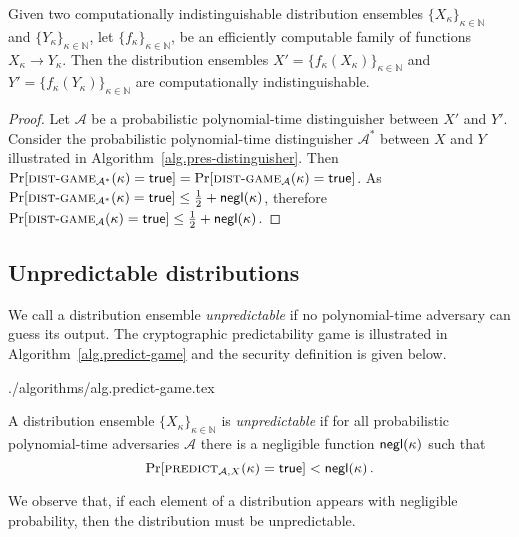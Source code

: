 \begin{lem}\label{lem:ind-pres}
  Given two
  computationally indistinguishable distribution ensembles
  $\{X_\kappa\}_{\kappa\in\mathbb{N}}$ and $\{Y_\kappa\}_{\kappa\in\mathbb{N}}$,
  let
  $\{f_\kappa\}_{\kappa\in\mathbb{N}}$,
  be an efficiently computable family of functions $X_\kappa \longrightarrow Y_\kappa$.
  Then the distribution ensembles
  $X' = \{f_\kappa(X_\kappa)\}_{\kappa\in\mathbb{N}}$
  and
  $Y' = \{f_\kappa(Y_\kappa)\}_{\kappa\in\mathbb{N}}$
  are computationally indistinguishable.
\end{lem}
\begin{proof}
  Let $\mathcal{A}$ be a probabilistic polynomial-time distinguisher
  between $X'$ and $Y'$. Consider the probabilistic polynomial-time distinguisher $\mathcal{A}^*$ between $X$ and $Y$ illustrated in Algorithm~\ref{alg.pres-distinguisher}. Then
  $\Pr[\textsc{dist}\-\text{-}\-\textsc{game}_{\mathcal{A}^*}(\kappa) = \mathsf{true}] =
   \Pr[\textsc{dist}\-\text{-}\-\textsc{game}_{\mathcal{A}}(\kappa) = \mathsf{true}]$.
  As $\Pr[\textsc{dist}\-\text{-}\-\textsc{game}_{\mathcal{A}^*}(\kappa) = \mathsf{true}] \leq \frac{1}{2} + \textsf{negl}(\kappa)$, therefore $\Pr[\textsc{dist}\-\text{-}\-\textsc{game}_{\mathcal{A}}(\kappa) = \mathsf{true}] \leq \frac{1}{2} + \textsf{negl}(\kappa)$.
\end{proof}

\subsection{Unpredictable distributions}\label{sec:proofs:unpred-dist}

We call a distribution ensemble \emph{unpredictable} if no
polynomial-time adversary can guess its output. The cryptographic
predictability game is illustrated in Algorithm~\ref{alg.predict-game} and the
security definition is given below.

{./algorithms/alg.predict-game.tex}

\begin{definition}
  A distribution ensemble $\{X_{\kappa}\}_{\kappa\in\mathbb{N}}$ is
  \emph{unpredictable} if for all probabilistic polynomial-time adversaries
  $\mathcal{A}$ there is a negligible function $\textsf{negl}(\kappa)$ such that
  \[\Pr[\textsc{predict}_{\mathcal{A},X}(\kappa) = \mathsf{true}] < \textsf{negl}(\kappa)\,.\]
\end{definition}

We observe that, if each element of a distribution appears with negligible
probability, then the distribution must be unpredictable.

